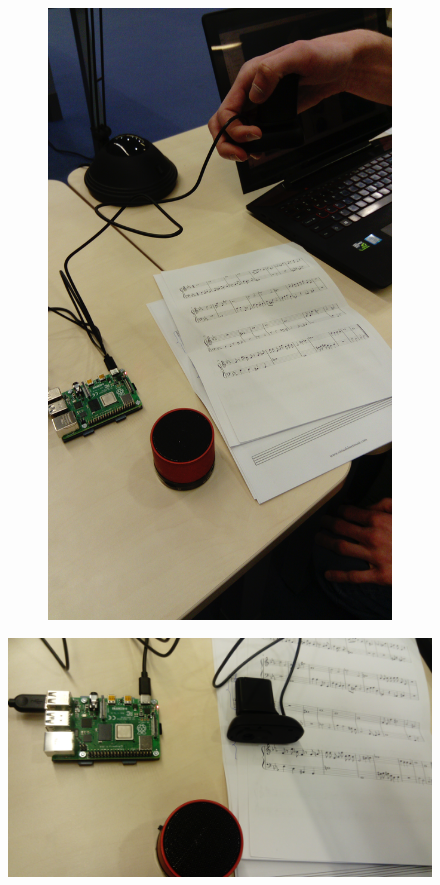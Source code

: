 \documentclass[12pt]{article}
\begin{document}
\begin{figure}[h!]
\begin{subfigure}[b]{0.45\linewidth}
		\includegraphics[width=1.7\linewidth,angle=270,origin=c]{DSC_0075.JPG}
	\end{subfigure}
\end{figure}

\begin{figure}[h!]
	\centering
	\includegraphics[width=0.9\linewidth]{DSC_0077.JPG}
\end{figure}
\end{document}
